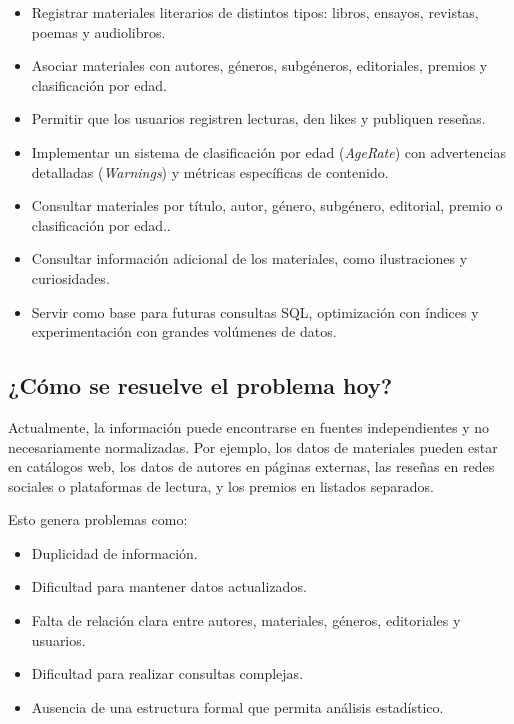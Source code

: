 \documentclass[12pt,a4paper]{article}
\begin{document}
\begin{itemize}
    \item Registrar materiales literarios de distintos tipos: libros, ensayos, revistas, poemas y audiolibros.
    \item Asociar materiales con autores, géneros, subgéneros, editoriales, premios y clasificación por edad.
    \item Permitir que los usuarios registren lecturas, den likes y publiquen reseñas.
    \item Implementar un sistema de clasificación por edad (\textit{AgeRate}) con advertencias detalladas (\textit{Warnings}) y métricas específicas de contenido.
    \item Consultar materiales por título, autor, género, subgénero, editorial, premio o clasificación por edad..
    \item Consultar información adicional de los materiales, como ilustraciones y curiosidades.
    \item Servir como base para futuras consultas SQL, optimización con índices y experimentación con grandes volúmenes de datos.
\end{itemize}

\subsection{¿Cómo se resuelve el problema hoy?}

Actualmente, la información puede encontrarse en fuentes independientes y no necesariamente normalizadas. Por ejemplo, los datos de materiales pueden estar en catálogos web, los datos de autores en páginas externas, las reseñas en redes sociales o plataformas de lectura, y los premios en listados separados.

Esto genera problemas como:

\begin{itemize}
    \item Duplicidad de información.
    \item Dificultad para mantener datos actualizados.
    \item Falta de relación clara entre autores, materiales, géneros, editoriales y usuarios.
    \item Dificultad para realizar consultas complejas.
    \item Ausencia de una estructura formal que permita análisis estadístico.
\end{itemize}
\end{document}

